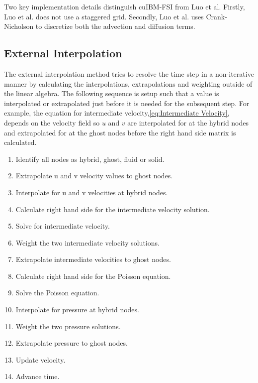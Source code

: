 \documentclass[onehalf,11pt]{beavtex}
\begin{document}
Two key implementation details distinguish cuIBM-FSI from Luo et al. 
Firstly, Luo et al. does not use a staggered grid. 
Secondly, Luo et al. uses Crank-Nicholson to discretize both the advection and diffusion terms. 

\subsection{External Interpolation}
\label{sec:ID external}
The external interpolation method tries to resolve the time step in a non-iterative manner by calculating the interpolations, extrapolations and weighting outside of the linear algebra. 
The following sequence is setup such that a value is interpolated or extrapolated just before it is needed for the subsequent step.
For example, the equation for intermediate velocity,\eqref{eq:Intermediate Velocity}, depends on the velocity field so $u$ and $v$ are interpolated for at the hybrid nodes and extrapolated for at the ghost nodes before the right hand side matrix is calculated.

\begin{enumerate}
	\item Identify all nodes as hybrid, ghost, fluid or solid.
	\item Extrapolate u and v velocity values to ghost nodes.
	\item Interpolate for u and v velocities at hybrid nodes.
	\item Calculate right hand side for the intermediate velocity solution.
	\item Solve for intermediate velocity.
	\item Weight the two intermediate velocity solutions.
	\item Extrapolate intermediate velocities to ghost nodes.
	\item Calculate right hand side for the Poisson equation.
	\item Solve the Poisson equation.
	\item Interpolate for pressure at hybrid nodes.
	\item Weight the two pressure solutions.
	\item Extrapolate pressure to ghost nodes.
	\item Update velocity.
	\item Advance time.
\end{enumerate}
\end{document}
